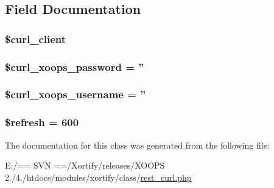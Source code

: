 \subsection{Field Documentation}
\hypertarget{class_r_e_s_t___c_u_r_l_xortify_exchange_a402f2112991f3227835af80e9df33e38}{
\subsubsection[{\$curl\-\_\-client}]{\setlength{\rightskip}{0pt plus 5cm}\$curl\-\_\-client}}\label{class_r_e_s_t___c_u_r_l_xortify_exchange_a402f2112991f3227835af80e9df33e38}
\hypertarget{class_r_e_s_t___c_u_r_l_xortify_exchange_a6c9851541ed3826c67cfe7224c38f0b8}{
\subsubsection[{\$curl\-\_\-xoops\-\_\-password}]{\setlength{\rightskip}{0pt plus 5cm}\$curl\-\_\-xoops\-\_\-password = ''}}\label{class_r_e_s_t___c_u_r_l_xortify_exchange_a6c9851541ed3826c67cfe7224c38f0b8}
\hypertarget{class_r_e_s_t___c_u_r_l_xortify_exchange_aab7480ba9f878a02b2c9fd43922fa070}{
\subsubsection[{\$curl\-\_\-xoops\-\_\-username}]{\setlength{\rightskip}{0pt plus 5cm}\$curl\-\_\-xoops\-\_\-username = ''}}\label{class_r_e_s_t___c_u_r_l_xortify_exchange_aab7480ba9f878a02b2c9fd43922fa070}
\hypertarget{class_r_e_s_t___c_u_r_l_xortify_exchange_a8527f826b6959aaa92b0e51ee427ba1a}{
\subsubsection[{\$refresh}]{\setlength{\rightskip}{0pt plus 5cm}\$refresh = 600}}\label{class_r_e_s_t___c_u_r_l_xortify_exchange_a8527f826b6959aaa92b0e51ee427ba1a}


The documentation for this class was generated from the following file\-:\begin{DoxyCompactItemize}
\item 
E\-:/== S\-V\-N ==/\-Xortify/releases/\-X\-O\-O\-P\-S 2./4./htdocs/modules/xortify/class/\hyperlink{rest__curl_8php}{rest\-\_\-curl.\-php}\end{DoxyCompactItemize}
